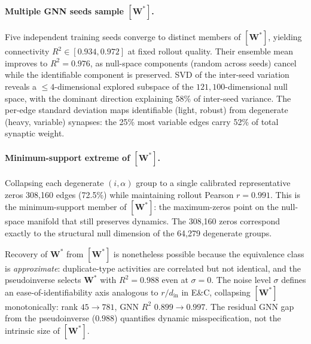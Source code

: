 \documentclass[11pt,a4paper]{article}
\begin{document}
\paragraph{Multiple GNN seeds sample $[\mathbf{W}^*]$.}
Five independent training seeds converge to distinct members of $[\mathbf{W}^*]$,
yielding connectivity $R^2 \in [0.934, 0.972]$ at fixed rollout quality.  Their
ensemble mean improves to $R^2=0.976$, as null-space components (random across
seeds) cancel while the identifiable component is preserved.  SVD of the
inter-seed variation reveals a $\leq 4$-dimensional explored subspace of the
$121{,}100$-dimensional null space, with the dominant direction explaining 58\%
of inter-seed variance.  The per-edge standard deviation maps identifiable
(light, robust) from degenerate (heavy, variable) synapses: the 25\% most
variable edges carry 52\% of total synaptic weight.

\paragraph{Minimum-support extreme of $[\mathbf{W}^*]$.}
Collapsing each degenerate $(i,\alpha)$ group to a single calibrated
representative zeros 308,160 edges (72.5\%) while maintaining rollout Pearson
$r = 0.991$.  This is the minimum-support member of $[\mathbf{W}^*]$:
the maximum-zeros point on the null-space manifold that still preserves dynamics.
The 308,160 zeros correspond exactly to the structural null dimension of the
64,279 degenerate groups.

Recovery of $\mathbf{W}^*$ from $[\mathbf{W}^*]$ is nonetheless possible because
the equivalence class is \emph{approximate}: duplicate-type activities are
correlated but not identical, and the pseudoinverse selects $\mathbf{W}^*$ with
$R^2 = 0.988$ even at $\sigma=0$. The noise level $\sigma$ defines an
ease-of-identifiability axis analogous to $r/d_{\text{in}}$ in E\&C, collapsing
$[\mathbf{W}^*]$ monotonically: rank $45 \to 781$, GNN $R^2$ $0.899 \to 0.997$.
The residual GNN gap from the pseudoinverse ($0.988$) quantifies dynamic
misspecification, not the intrinsic size of $[\mathbf{W}^*]$.
\end{document}
